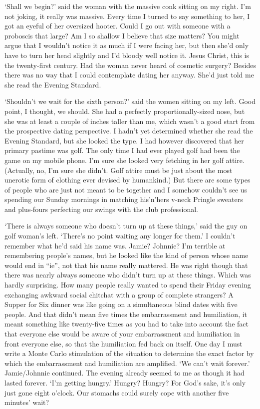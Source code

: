 
\twelverm
`Shall we begin?' said the woman with the massive conk sitting on my
right. I'm not joking, it really {\twelveit was\/} massive. Every
time I turned to say something to her, I got an eyeful of her
oversized hooter. Could I go out with someone with a proboscis that
large? Am I so shallow I believe that size matters? You might argue
that I wouldn't notice it as much if I were facing her, but then
she'd only have to turn her head slightly and I'd bloody well notice
it. Jesus Christ, this is the twenty-first century. Had the woman
never heard of cosmetic surgery? Besides there was no way that I
could contemplate dating her anyway. She'd just told me she read the
{\twelvesl Evening Standard}.

`Shouldn't we wait for the sixth person?' said the women sitting on
my left. Good point, I thought, we should. She had a perfectly
proportionally-sized nose, but she was at least a couple of inches
taller than me, which wasn't a good start from the prospective dating perspective.
I hadn't yet determined whether she read the
{\twelvesl Evening Standard}, but she looked the type. I had however
discovered that her primary pastime was golf. The only time I had
ever played golf had been the game on my mobile phone. I'm sure she
looked very fetching in her golf attire. (Actually, no, I'm sure she
didn't. Golf attire must be just about the most unerotic form of
clothing ever devised by humankind.) But there are some
types of people who are just not meant to be together and I somehow
couldn't see us spending our Sunday mornings in matching his'n'hers
v-neck Pringle sweaters and plus-fours perfecting our swings with
the club professional.

`There is always someone who doesn't turn up at these things,' said
the guy on golf woman's left. `There's no point waiting any
longer for them.' I couldn't remember what he'd said his name was.
Jamie? Johnnie? I'm terrible at remembering people's names, but he
looked like the kind of person whose name would end in ``ie'', not
that his name really mattered. He was right though that
there was nearly always someone who didn't turn up at these things.
Which was hardly surprising. How many people really wanted to spend
their Friday evening exchanging awkward social chitchat with a group
of complete strangers? A Supper for Six dinner was like going on a simultaneous
blind dates with five people. And that didn't mean five times the
embarrassment and humiliation, it meant something like twenty-five times as you had to
take into account the fact that everyone else would be aware of your embarrassment and
humiliation in front everyone else, so that the humiliation fed
back on itself. One day I must write a Monte Carlo stimulation of
the situation to determine the exact factor by which the embarrassment and humiliation
are amplified. `We can't wait forever.' Jamie/Johnnie continued. The
evening already seemed to me as though it had lasted forever. `I'm
getting hungry.' Hungry? Hungry? For God's sake, it's only just gone
eight o'clock. Our stomachs could surely cope with another five minutes' wait?

